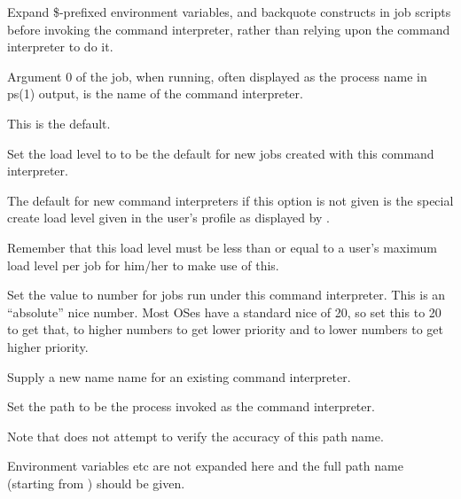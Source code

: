 

Expand \$-prefixed environment variables,  and backquote constructs in job scripts before invoking the command interpreter, rather than relying upon the command interpreter to do it.


Argument 0 of the job, when running, often displayed as the process name in ps(1) output, is the name of the command interpreter.

This is the default.


Set the load level to  to be the default for new jobs created with this command interpreter.

The default for new command interpreters if this option is not given is the special create load level given in the user's profile as displayed by
\PrBtuser{}.

Remember that this load level must be less than or equal to a user's maximum load level per job for him/her to make use of this.


Set the  value to number for jobs run under this command interpreter.
This is an ``absolute'' nice number. Most OSes have a standard nice of 20, so set this to 20 to get that,
to higher numbers to get lower priority and to lower numbers to get higher priority.


Supply a new name name for an existing command interpreter.



Set the path  to be the process invoked as the command interpreter.

Note that \PrBtcichange{} does not attempt to verify the accuracy of this path name.

Environment variables etc are not expanded here and the full path name (starting from \filename{/}) should be given.

